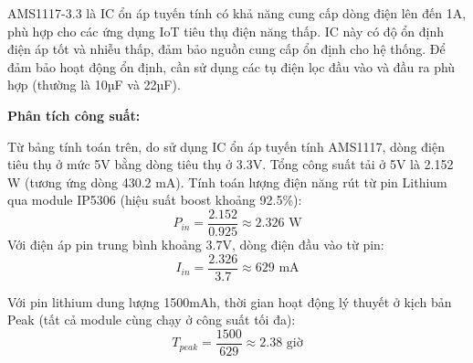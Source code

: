 \documentclass{article} %
\begin{document}
AMS1117-3.3 là IC ổn áp tuyến tính có khả năng cung cấp dòng điện lên đến 1A, phù hợp cho các ứng dụng IoT tiêu thụ điện năng thấp. IC này có độ ổn định điện áp tốt và nhiễu thấp, đảm bảo nguồn cung cấp ổn định cho hệ thống. Để đảm bảo hoạt động ổn định, cần sử dụng các tụ điện lọc đầu vào và đầu ra phù hợp (thường là 10µF và 22µF).


\textbf{Phân tích công suất:}
\begin{table}[H]
    \centering
    \caption{Bảng tính toán công suất nguồn Node MSMS ở kịch bản Peak}
    \label{tab:power_peak_msms}
    \renewcommand{\arraystretch}{1.3}
\end{table}
    
Từ bảng tính toán trên, do sử dụng IC ổn áp tuyến tính AMS1117, dòng điện tiêu thụ ở mức 5V bằng dòng tiêu thụ ở 3.3V. Tổng công suất tải ở 5V là 2.152 W (tương ứng dòng 430.2 mA). Tính toán lượng điện năng rút từ pin Lithium qua module IP5306 (hiệu suất boost khoảng 92.5\%):
\[
P_{in} = \frac{2.152}{0.925} \approx 2.326 \text{ W}
\]
Với điện áp pin trung bình khoảng 3.7V, dòng điện đầu vào từ pin:
\[
I_{in} = \frac{2.326}{3.7} \approx 629 \text{ mA}
\]

Với pin lithium dung lượng 1500mAh, thời gian hoạt động lý thuyết ở kịch bản Peak (tất cả module cùng chạy ở công suất tối đa):
\[
T_{peak} = \frac{1500}{629} \approx 2.38 \text{ giờ}
\]
\end{document}
